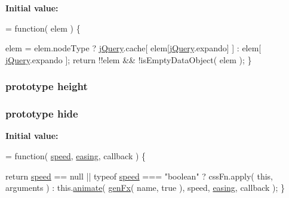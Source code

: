 {\bfseries Initial value\-:}
\begin{DoxyCode}
= \textcolor{keyword}{function}( elem ) \{


        elem = elem.nodeType ? \hyperlink{jquery-1_810_82-vsdoc_8js_add5237586d970a38a81f990e8eb28c6c}{jQuery}.cache[ elem[\hyperlink{jquery-1_810_82-vsdoc_8js_add5237586d970a38a81f990e8eb28c6c}{jQuery}.expando] ] : elem[ 
      \hyperlink{jquery-1_810_82-vsdoc_8js_add5237586d970a38a81f990e8eb28c6c}{jQuery}.expando ];
        \textcolor{keywordflow}{return} !!elem && !isEmptyDataObject( elem );
    \}
\end{DoxyCode}
\hypertarget{jquery-1_810_82-vsdoc_8js_ac05c0989a60ed0912fa475cb09c11162}{
\subsubsection[{height}]{ {\bf prototype} height}}\label{jquery-1_810_82-vsdoc_8js_ac05c0989a60ed0912fa475cb09c11162}
\hypertarget{jquery-1_810_82-vsdoc_8js_ab184a969b4c8542290dae744d90fd4d2}{
\subsubsection[{hide}]{ {\bf prototype} hide}}\label{jquery-1_810_82-vsdoc_8js_ab184a969b4c8542290dae744d90fd4d2}
{\bfseries Initial value\-:}
\begin{DoxyCode}
= \textcolor{keyword}{function}( \hyperlink{jquery-1_810_82-vsdoc_8js_add98c90065e6563cba26ff6d2016c46c}{speed}, \hyperlink{jquery-1_810_82-vsdoc_8js_a9758a312629fa6de1744280dd6e6253b}{easing}, callback ) \{


        \textcolor{keywordflow}{return} \hyperlink{jquery-1_810_82-vsdoc_8js_add98c90065e6563cba26ff6d2016c46c}{speed} == null || typeof \hyperlink{jquery-1_810_82-vsdoc_8js_add98c90065e6563cba26ff6d2016c46c}{speed} === \textcolor{stringliteral}{"boolean"} ?
            cssFn.apply( \textcolor{keyword}{this}, arguments ) :
            this.\hyperlink{jquery-1_810_82-vsdoc_8js_a956a1d08128d41115c45b6815814a64d}{animate}( \hyperlink{jquery-1_810_82_8js_a0dad9ae6c57fd32a071de202faa87081}{genFx}( name, \textcolor{keyword}{true} ), speed, \hyperlink{jquery-1_810_82-vsdoc_8js_a9758a312629fa6de1744280dd6e6253b}{easing}, callback );
    \}
\end{DoxyCode}

